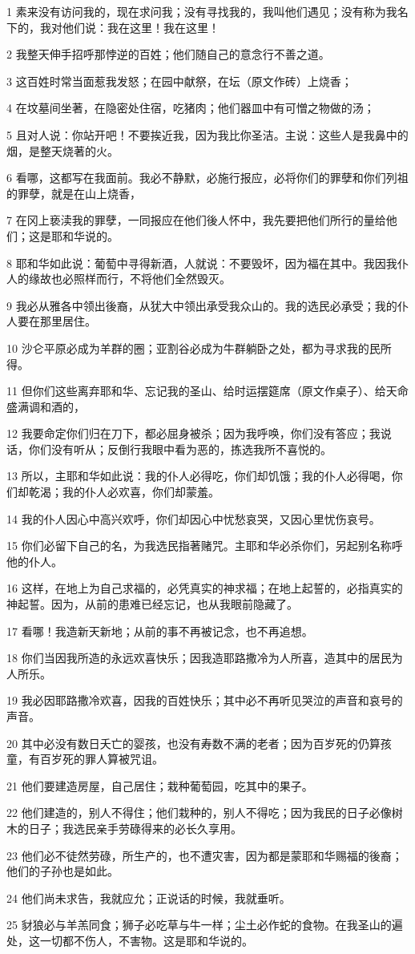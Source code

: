 \par 1 素来没有访问我的，现在求问我；没有寻找我的，我叫他们遇见；没有称为我名下的，我对他们说：我在这里！我在这里！
\par 2 我整天伸手招呼那悖逆的百姓；他们随自己的意念行不善之道。
\par 3 这百姓时常当面惹我发怒；在园中献祭，在坛（原文作砖）上烧香；
\par 4 在坟墓间坐著，在隐密处住宿，吃猪肉；他们器皿中有可憎之物做的汤；
\par 5 且对人说：你站开吧！不要挨近我，因为我比你圣洁。主说：这些人是我鼻中的烟，是整天烧著的火。
\par 6 看哪，这都写在我面前。我必不静默，必施行报应，必将你们的罪孽和你们列祖的罪孽，就是在山上烧香，
\par 7 在冈上亵渎我的罪孽，一同报应在他们後人怀中，我先要把他们所行的量给他们；这是耶和华说的。
\par 8 耶和华如此说：葡萄中寻得新酒，人就说：不要毁坏，因为福在其中。我因我仆人的缘故也必照样而行，不将他们全然毁灭。
\par 9 我必从雅各中领出後裔，从犹大中领出承受我众山的。我的选民必承受；我的仆人要在那里居住。
\par 10 沙仑平原必成为羊群的圈；亚割谷必成为牛群躺卧之处，都为寻求我的民所得。
\par 11 但你们这些离弃耶和华、忘记我的圣山、给时运摆筵席（原文作桌子）、给天命盛满调和酒的，
\par 12 我要命定你们归在刀下，都必屈身被杀；因为我呼唤，你们没有答应；我说话，你们没有听从；反倒行我眼中看为恶的，拣选我所不喜悦的。
\par 13 所以，主耶和华如此说：我的仆人必得吃，你们却饥饿；我的仆人必得喝，你们却乾渴；我的仆人必欢喜，你们却蒙羞。
\par 14 我的仆人因心中高兴欢呼，你们却因心中忧愁哀哭，又因心里忧伤哀号。
\par 15 你们必留下自己的名，为我选民指著赌咒。主耶和华必杀你们，另起别名称呼他的仆人。
\par 16 这样，在地上为自己求福的，必凭真实的神求福；在地上起誓的，必指真实的神起誓。因为，从前的患难已经忘记，也从我眼前隐藏了。
\par 17 看哪！我造新天新地；从前的事不再被记念，也不再追想。
\par 18 你们当因我所造的永远欢喜快乐；因我造耶路撒冷为人所喜，造其中的居民为人所乐。
\par 19 我必因耶路撒冷欢喜，因我的百姓快乐；其中必不再听见哭泣的声音和哀号的声音。
\par 20 其中必没有数日夭亡的婴孩，也没有寿数不满的老者；因为百岁死的仍算孩童，有百岁死的罪人算被咒诅。
\par 21 他们要建造房屋，自己居住；栽种葡萄园，吃其中的果子。
\par 22 他们建造的，别人不得住；他们栽种的，别人不得吃；因为我民的日子必像树木的日子；我选民亲手劳碌得来的必长久享用。
\par 23 他们必不徒然劳碌，所生产的，也不遭灾害，因为都是蒙耶和华赐福的後裔；他们的子孙也是如此。
\par 24 他们尚未求告，我就应允；正说话的时候，我就垂听。
\par 25 豺狼必与羊羔同食；狮子必吃草与牛一样；尘土必作蛇的食物。在我圣山的遍处，这一切都不伤人，不害物。这是耶和华说的。

